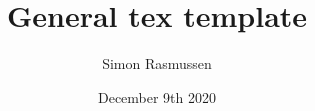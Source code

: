 \title{General tex template}
\author{Simon Rasmussen}
\date{December 9th 2020}
\maketitle
\clearpage
